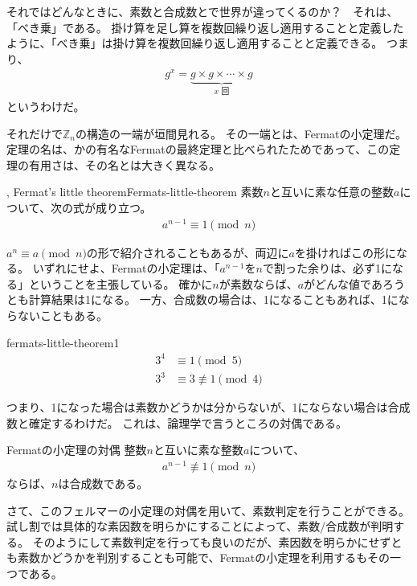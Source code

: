 それではどんなときに、素数と合成数とで世界が違ってくるのか？　それは、「べき乗」である。
掛け算を足し算を複数回繰り返し適用することと定義したように、「べき乗」は掛け算を複数回繰り返し適用することと定義できる。
つまり、
\begin{align*}
g^x = \underbrace{g \times g \times \cdots \times g}_{x \mbox{ 回}}
\end{align*}
というわけだ。

それだけで$\mathbb{Z}_n$の構造の一端が垣間見れる。
その一端とは、Fermatの小定理だ。
定理の名は、かの有名なFermatの最終定理と比べられたためであって、この定理の有用さは、その名とは大きく異なる。

\begin{Theo}{, Fermat's little theorem}{Fermats-little-theorem}
素数$n$と互いに素な任意の整数$a$について、次の式が成り立つ。
\begin{align*}
a^{n-1} \equiv 1 \pmod{n}
\end{align*}
\end{Theo}

$a^n\equiv a\pmod{n}$の形で紹介されることもあるが、両辺に$a$を掛ければこの形になる。
いずれにせよ、Fermatの小定理は、「$a^{n-1}$を$n$で割った余りは、必ず1になる」ということを主張している。
確かに$n$が素数ならば、$a$がどんな値であろうとも計算結果は1になる。
一方、合成数の場合は、1になることもあれば、1にならないこともある。

\begin{Exam}{}{fermats-little-theorem1}
\begin{align*}
3^4 &\equiv 1 \pmod{5}\\
3^3 &\equiv 3 \not\equiv 1 \pmod{4}
\end{align*}
\end{Exam}

つまり、1になった場合は素数かどうかは分からないが、1にならない場合は合成数と確定するわけだ。
これは、論理学で言うところの対偶である。

\begin{Theo}{Fermatの小定理の対偶}{}
整数$n$と互いに素な整数$a$について、
\begin{align*}
a^{n-1} \not\equiv 1 \pmod{n}
\end{align*}
ならば、$n$は合成数である。
\end{Theo}

さて、このフェルマーの小定理の対偶を用いて、素数判定を行うことができる。
試し割では具体的な素因数を明らかにすることによって、素数/合成数が判明する。
そのようにして素数判定を行っても良いのだが、素因数を明らかにせずとも素数かどうかを判別することも可能で、Fermatの小定理を利用するもその一つである。

